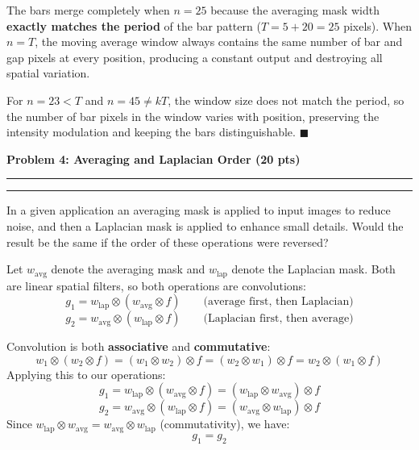 \documentclass[12pt]{article}
\newcommand{\question}[1]{%
  \clearpage
  \vspace{0.5cm}
  {\noindent\normalsize \textbf{#1}}
  \vspace{0.2cm}
  \hrule
  \vspace{0.1cm}
  \hrule
  \vspace{0.3cm}
}
\begin{document}
\begin{resultsbox}
The bars merge completely when $n = 25$ because the averaging mask width \textbf{exactly matches the period} of the bar pattern ($T = 5 + 20 = 25$ pixels). When $n = T$, the moving average window always contains the same number of bar and gap pixels at every position, producing a constant output and destroying all spatial variation.

For $n = 23 < T$ and $n = 45 \neq kT$, the window size does not match the period, so the number of bar pixels in the window varies with position, preserving the intensity modulation and keeping the bars distinguishable. $\blacksquare$
\end{resultsbox}



\question{Problem 4: Averaging and Laplacian Order (20 pts)}\label{quest:4}

In a given application an averaging mask is applied to input images to reduce noise, and then a Laplacian mask is applied to enhance small details. Would the result be the same if the order of these operations were reversed?

\vspace{0.5cm}

\begin{stepbox}
Let $w_{\text{avg}}$ denote the averaging mask and $w_{\text{lap}}$ denote the Laplacian mask. Both are linear spatial filters, so both operations are convolutions:
\[
g_1 = w_{\text{lap}} \otimes (w_{\text{avg}} \otimes f) \qquad \text{(average first, then Laplacian)}
\]
\[
g_2 = w_{\text{avg}} \otimes (w_{\text{lap}} \otimes f) \qquad \text{(Laplacian first, then average)}
\]
\end{stepbox}

\begin{stepbox}
Convolution is both \textbf{associative} and \textbf{commutative}:
\[
w_1 \otimes (w_2 \otimes f) = (w_1 \otimes w_2) \otimes f = (w_2 \otimes w_1) \otimes f = w_2 \otimes (w_1 \otimes f)
\]
Applying this to our operations:
\[
g_1 = w_{\text{lap}} \otimes (w_{\text{avg}} \otimes f) = (w_{\text{lap}} \otimes w_{\text{avg}}) \otimes f
\]
\[
g_2 = w_{\text{avg}} \otimes (w_{\text{lap}} \otimes f) = (w_{\text{avg}} \otimes w_{\text{lap}}) \otimes f
\]
Since $w_{\text{lap}} \otimes w_{\text{avg}} = w_{\text{avg}} \otimes w_{\text{lap}}$ (commutativity), we have:
\[
g_1 = g_2
\]
\end{stepbox}
\end{document}
